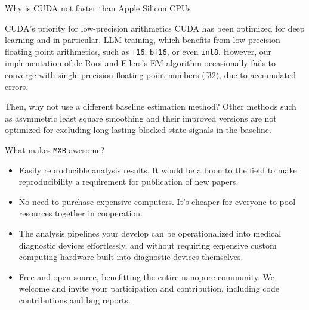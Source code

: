 \documentclass{beamer}
\begin{document}
\begin{frame}[allowframebreaks]{Why is CUDA not faster than Apple Silicon CPUs}
    \begin{block}{CUDA's priority for low-precision arithmetics}
        CUDA has been optimized for deep learning and in particular, LLM training, which benefits from low-precision floating point arithmetics, such as \texttt{f16}, \texttt{bf16}, or even \texttt{int8}. However, our implementation of de Rooi and Eilers's EM algorithm occasionally fails to converge with single-precision floating point numbers (f32), due to accumulated errors.
    \end{block}\pause

    
    \begin{block}{Then, why not use a different baseline estimation method?}
        Other methods such as asymmetric least square smoothing and their improved versions are not optimized for excluding long-lasting blocked-state signals in the baseline.
    \end{block}
\end{frame}

\begin{frame}{What makes \texttt{MXB} awesome?}
    \begin{itemize}
        \item Easily reproducible analysis results. It would be a boon to the field to make reproducibility a requirement for publication of new papers.\pause
        \item No need to purchase expensive computers. It's cheaper for everyone to pool resources together in cooperation.\pause
        \item The analysis pipelines your develop can be operationalized into medical diagnostic devices effortlessly, and without requiring expensive custom computing hardware built into diagnostic devices themselves.\pause
        \item Free and open source, benefitting the entire nanopore community. We welcome and invite your participation and contribution, including code contributions and bug reports.
    \end{itemize}
\end{frame}
\end{document}
